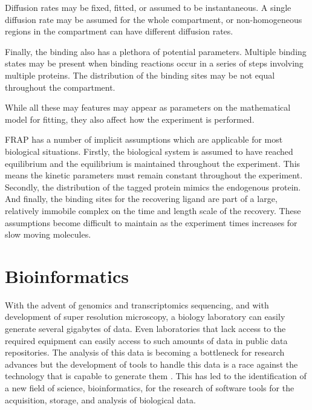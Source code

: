     Diffusion rates may be fixed, fitted, or assumed to be instantaneous.
    A single diffusion rate may be assumed for the whole
    compartment, or non-homogeneous regions in the compartment
    can have different diffusion rates.

    Finally, the binding also has a plethora of potential parameters.  Multiple
    binding states may be present when binding reactions occur in a
    series of steps involving multiple proteins.  The distribution of
    the binding sites may be not equal throughout the compartment.

    While all these may features may appear
    as parameters on the mathematical model for
    fitting, they also affect how the experiment is performed.

    FRAP has a number of implicit assumptions which are applicable
    for most biological situations.
    Firstly, the biological system is assumed to have
    reached equilibrium and the equilibrium
    is maintained throughout the experiment.
    This means the kinetic parameters
    must remain constant throughout the experiment.
    Secondly, the distribution of the tagged protein mimics the endogenous
    protein.
    And finally, the binding sites for the recovering ligand
    are part of a large, relatively immobile
    complex on the time and length scale of the recovery.
    These assumptions become difficult to maintain as the experiment
    times increases for slow moving molecules.

\section{Bioinformatics}

  With the advent of genomics and transcriptomics
  sequencing, and with development of super resolution microscopy,
  a biology laboratory can easily generate several gigabytes of data.
  Even laboratories that lack access to the required equipment can
  easily access to such amounts of data in public data repositories.
  The analysis of this data is becoming a bottleneck for research
  advances \citep{marx2013biology-big-data} but the development of
  tools to handle this data is a race against the technology that is
  capable to generate them \citep{delisi1988computers-molecular-biology}.
  This has led to the identification of a new field of science,
  bioinformatics, for the research of software tools for the
  acquisition, storage, and analysis of biological data.

